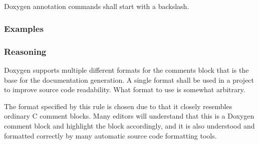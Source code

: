 \subsection*{\doxygenRule{}}

Doxygen annotation commands shall start with a backslash.

\subsubsection*{Examples}

\noindent
\begin{minipage}[t]{0.47\textwidth}
    
\end{minipage}\hfill
\begin{minipage}[t]{0.47\textwidth}
    
\end{minipage}


\subsubsection*{Reasoning}

Doxygen supports multiple different formats for the comments block that is the base for the documentation generation. A single format shall be used in a project to improve source code readability. What format to use is somewhat arbitrary.

The format specified by this rule is chosen due to that it closely resembles ordinary C comment blocks. Many editors will understand that this is a Doxygen comment block and highlight the block accordingly, and it is also understood and formatted correctly by many automatic source code formatting tools.
